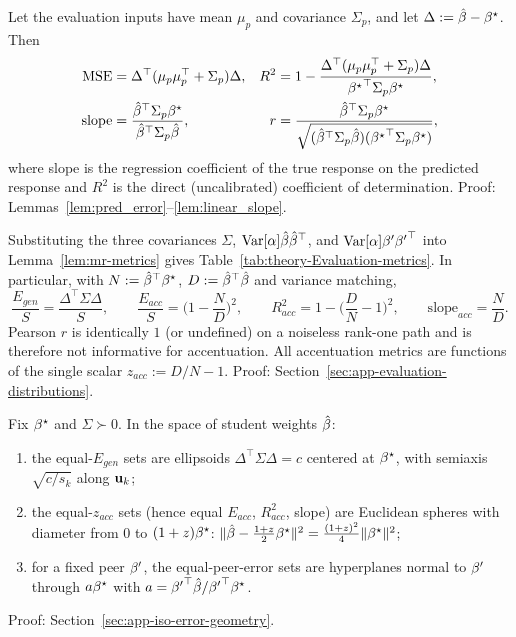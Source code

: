 \begin{lem}
\label{lem:mr-metrics}
Let the evaluation inputs have mean $\mu_p$ and covariance $\Sigma_p$, and let
$\Delta:=\hat{\beta}-{\beta^{\star}}$.  Then
\begin{align}
\mathrm{MSE}&=\Delta^\top(\mu_p\mu_p^\top+\Sigma_p)\Delta, &
R^2&=1-\frac{\Delta^\top(\mu_p\mu_p^\top+\Sigma_p)\Delta}{{{\beta^{\star}}}^\top\Sigma_p{\beta^{\star}}},\\
\mathrm{slope}&=\frac{{\hat{\beta}}^\top\Sigma_p{\beta^{\star}}}{{\hat{\beta}}^\top\Sigma_p\hat{\beta}}, &
r&=\frac{{\hat{\beta}}^\top\Sigma_p{\beta^{\star}}}
{\sqrt{({\hat{\beta}}^\top\Sigma_p\hat{\beta})({{\beta^{\star}}}^\top\Sigma_p{\beta^{\star}})}},
\end{align}
where slope is the regression coefficient of the true response on the
predicted response and $R^2$ is the direct (uncalibrated) coefficient of
determination.  Proof: Lemmas~\ref{lem:pred_error}--\ref{lem:linear_slope}.
\end{lem}

\begin{cor}
\label{cor:mr-three-evaluations}
Substituting the three covariances $\Sigma$, $\mathrm{Var}[\alpha]\hat{\beta}{\hat{\beta}}^\top$,
and $\mathrm{Var}[\alpha]{\beta^{\prime}}{{\beta^{\prime}}}^\top$ into Lemma~\ref{lem:mr-metrics} gives
Table~\ref{tab:theory-Evaluation-metrics}.  In particular, with
$N:={\hat{\beta}}^\top{\beta^{\star}}$, $D:={\hat{\beta}}^\top\hat{\beta}$ and variance matching,
\begin{equation}
\frac{E_{gen}}{S}=\frac{\Delta^\top\Sigma\Delta}{S},\qquad
\frac{E_{acc}}{S}=\Big(1-\frac ND\Big)^2,\qquad
R^2_{acc}=1-\Big(\frac DN-1\Big)^2,\qquad
\mathrm{slope}_{acc}=\frac ND .
\label{eq:mr-acc-metrics}
\end{equation}
Pearson $r$ is identically $1$ (or undefined) on a noiseless rank-one path and
is therefore not informative for accentuation.  All accentuation metrics are
functions of the single scalar $z_{acc}:=D/N-1$.
Proof: Section~\ref{sec:app-evaluation-distributions}.
\end{cor}

\begin{prop}
\label{prop:mr-iso-geometry}
Fix ${\beta^{\star}}$ and $\Sigma\succ0$.  In the space of student weights $\hat{\beta}$:
\begin{enumerate}
\item the equal-$E_{gen}$ sets are ellipsoids
$\Delta^\top\Sigma\Delta=c$ centered at ${\beta^{\star}}$, with semiaxis
$\sqrt{c/s_k}$ along ${\mathbf{u}}_k$;
\item the equal-$z_{acc}$ sets (hence equal $E_{acc}$, $R^2_{acc}$, slope)
are Euclidean spheres with diameter from $0$ to $(1+z){\beta^{\star}}$:
$\|\hat{\beta}-\tfrac{1+z}{2}{\beta^{\star}}\|^2=\tfrac{(1+z)^2}{4}\|{\beta^{\star}}\|^2$;
\item for a fixed peer ${\beta^{\prime}}$, the equal-peer-error sets are hyperplanes
normal to ${\beta^{\prime}}$ through $a{\beta^{\star}}$ with $a={{\beta^{\prime}}}^\top\hat{\beta}/{{\beta^{\prime}}}^\top{\beta^{\star}}$.
\end{enumerate}
Proof: Section~\ref{sec:app-iso-error-geometry}.
\end{prop}

